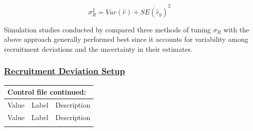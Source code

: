 \begin{equation}
	\sigma_R^2 = Var(\hat{r}) + \overline{SE(\hat{r}_y)}^2
\end{equation}

Simulation studies conducted by \citet{methot-adjusting-2011} compared three methods of tuning $\sigma_R$ with the above approach generally performed best since it accounts for variability among recruitment deviations and the uncertainty in their estimates.

\hypertarget{RecDevSetup}{}
\subsubsection[Recruitment Deviation Setup]{\protect\hyperlink{RecDevSetup}{Recruitment Deviation Setup}}
\begin{longtable}{p{1cm} p{3cm} p{12cm}}
	\multicolumn{3}{l}{Control file continued:} \\

	\hline
	Value & Label & Description \Tstrut\Bstrut\\
	\hline
	\endfirsthead

	\hline
	Value & Label & Description \Tstrut\Bstrut\\
	\hline
	\endhead
	\hline
	\endfoot
	\endlastfoot



\end{longtable}
